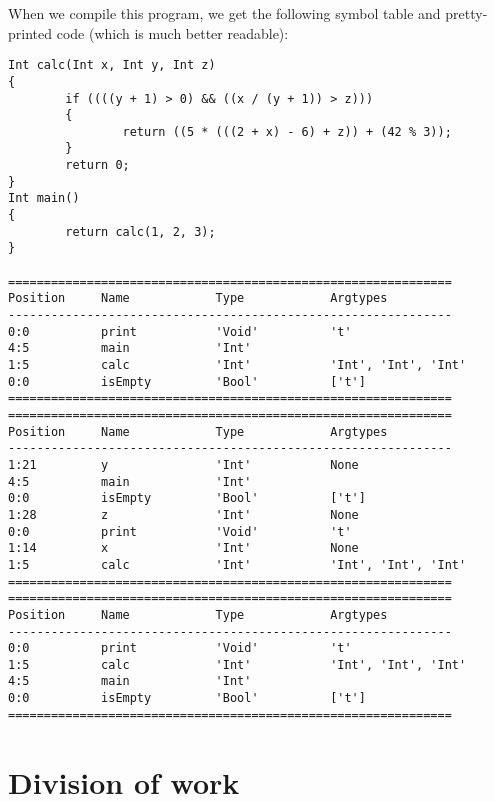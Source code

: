 \documentclass[a4paper]{article}
\begin{document}
When we compile this program, we get the following symbol table and pretty-printed code (which is much better readable):
\begin{verbatim}
Int calc(Int x, Int y, Int z)
{
        if ((((y + 1) > 0) && ((x / (y + 1)) > z)))
        {
                return ((5 * (((2 + x) - 6) + z)) + (42 % 3));
        }
        return 0;
}
Int main()
{
        return calc(1, 2, 3);
}

==============================================================
Position     Name            Type            Argtypes            
--------------------------------------------------------------
0:0          print           'Void'          't'                 
4:5          main            'Int'                               
1:5          calc            'Int'           'Int', 'Int', 'Int' 
0:0          isEmpty         'Bool'          ['t']               
==============================================================
==============================================================
Position     Name            Type            Argtypes            
--------------------------------------------------------------
1:21         y               'Int'           None                
4:5          main            'Int'                               
0:0          isEmpty         'Bool'          ['t']               
1:28         z               'Int'           None                
0:0          print           'Void'          't'                 
1:14         x               'Int'           None                
1:5          calc            'Int'           'Int', 'Int', 'Int' 
==============================================================
==============================================================
Position     Name            Type            Argtypes            
--------------------------------------------------------------
0:0          print           'Void'          't'                 
1:5          calc            'Int'           'Int', 'Int', 'Int' 
4:5          main            'Int'                               
0:0          isEmpty         'Bool'          ['t']               
==============================================================
\end{verbatim}

\newpage %
\section{Division of work}
\end{document}
